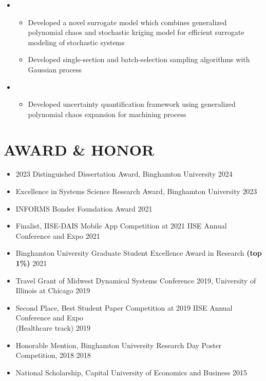\documentclass[10pt]{article}
\begin{document}
\begin{itemize}
\begin{itemize}[label=$\bullet$]
	    \item {}
	    \begin{itemize}[label=$-$]
	        \item Developed a novel surrogate model which combines generalized polynomial chaos and stochastic kriging model for efficient surrogate modeling of stochastic systems
	       
	        \item Developed single-section and batch-selection sampling algorithms with Gaussian process
	    \end{itemize}
	    
		\item {}
		\begin{itemize}[label=$-$]
		    \item Developed uncertainty quantification framework using generalized polynomial chaos expansion for machining process 
		\end{itemize}
	\end{itemize}
\end{itemize}


\section*{AWARD \& HONOR}
\begin{itemize}
	\item 2023 Distinguished Dissertation Award, Binghamton University
	\hfill{2024}
    \item Excellence in Systems Science Research Award, Binghamton University
	\hfill{2023}
	\item INFORMS Bonder Foundation Award
	\hfill{2021}
	\item Finalist, IISE-DAIS Mobile App Competition at 2021 IISE Annual Conference and Expo
	\hfill{2021}
	\item Binghamton University Graduate Student Excellence Award in Research \textbf{(top 1\%)}
	\hfill{2021}
	\item Travel Grant of Midwest Dynamical Systems Conference 2019, University of Illinois at Chicago 
	\hfill{2019}
	\item Second Place, Best Student Paper Competition at 2019 IISE Annual Conference and Expo \\(Healthcare track)
	\hfill{2019}
	\item Honorable Mention, Binghamton University Research Day Poster Competition, 2018
	\hfill{2018}
	\item National Scholarship, Capital University of Economics and Business
	\hfill{2015}
\end{itemize}
\end{document}
